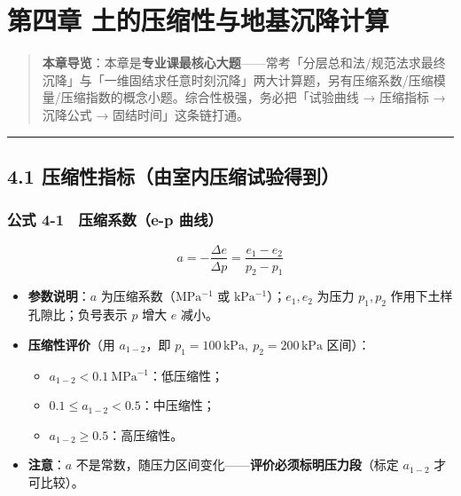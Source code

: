 \documentclass[
]{article}
\providecommand{\tightlist}{%
  \setlength{\itemsep}{0pt}\setlength{\parskip}{0pt}}
\begin{document}
\newpage

\section{第四章
土的压缩性与地基沉降计算}\label{ux7b2cux56dbux7ae0-ux571fux7684ux538bux7f29ux6027ux4e0eux5730ux57faux6c89ux964dux8ba1ux7b97}

\begin{quote}
\textbf{本章导览}：本章是\textbf{专业课最核心大题}------常考「分层总和法/规范法求最终沉降」与「一维固结求任意时刻沉降」两大计算题，另有压缩系数/压缩模量/压缩指数的概念小题。综合性极强，务必把「试验曲线
→ 压缩指标 → 沉降公式 → 固结时间」这条链打通。
\end{quote}

\begin{center}\rule{0.5\linewidth}{0.5pt}\end{center}

\subsection{4.1
压缩性指标（由室内压缩试验得到）}\label{ux538bux7f29ux6027ux6307ux6807ux7531ux5ba4ux5185ux538bux7f29ux8bd5ux9a8cux5f97ux5230}

\subsubsection{公式 4-1　压缩系数（e-p
曲线）}\label{ux516cux5f0f-4-1-ux538bux7f29ux7cfbux6570e-p-ux66f2ux7ebf}

\[\boxed{a=-\frac{\Delta e}{\Delta p}=\frac{e_1-e_2}{p_2-p_1}}\]

\begin{itemize}
\tightlist
\item
  \textbf{参数说明}：\(a\) 为压缩系数（\(\mathrm{MPa^{-1}}\) 或
  \(\mathrm{kPa^{-1}}\)）；\(e_1,e_2\) 为压力 \(p_1,p_2\)
  作用下土样孔隙比；负号表示 \(p\) 增大 \(e\) 减小。
\item
  \textbf{压缩性评价}（用 \(a_{1-2}\)，即
  \(p_1=100\,\mathrm{kPa},\ p_2=200\,\mathrm{kPa}\) 区间）：

  \begin{itemize}
  \tightlist
  \item
    \(a_{1-2}<0.1\ \mathrm{MPa^{-1}}\)：低压缩性；
  \item
    \(0.1\le a_{1-2}<0.5\)：中压缩性；
  \item
    \(a_{1-2}\ge0.5\)：高压缩性。
  \end{itemize}
\item
  \textbf{注意}：\(a\)
  不是常数，随压力区间变化------\textbf{评价必须标明压力段}（标定
  \(a_{1-2}\) 才可比较）。
\end{itemize}
\end{document}
